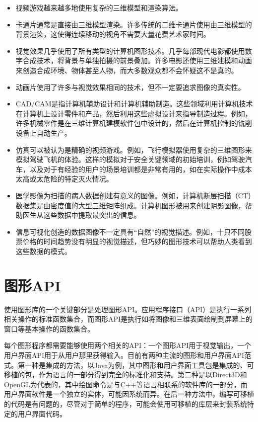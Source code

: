 \documentclass[lang=cn,10pt]{elegantbook}
\begin{document}
\begin{itemize}
\item 视频游戏越来越多地使用复杂的三维模型和渲染算法。
\item 卡通片通常是直接由三维模型渲染。许多传统的二维卡通片使用由三维模型的背景渲染，这使得连续移动的视角不需要大量花费艺术家时间。
\item 视觉效果几乎使用了所有类型的计算机图形技术。几乎每部现代电影都使用数字合成技术，将背景与单独拍摄的前景叠加。许多电影还使用三维建模和动画来创造合成环境、物体甚至人物，而大多数观众都不会怀疑这不是真的。
\item 动画片使用了许多与视觉效果相同的技术，但不一定要追求图像的真实性。
\item CAD/CAM是指计算机辅助设计和计算机辅助制造。这些领域利用计算机技术在计算机上设计零件和产品，然后利用这些虚拟设计来指导制造过程。例如，许多机械零件是在三维计算机建模软件包中设计的，然后在计算机控制的铣削设备上自动生产。
\item 仿真可以被认为是精确的视频游戏。例如，飞行模拟器使用复杂的三维图形来模拟驾驶飞机的体验。这样的模拟对于安全关键领域的初始培训，例如驾驶汽车，以及对于有经验的用户的场景培训都是非常有用的，如在实际操作中成本太高或太危险的特定灭火情况。
\item 医学影像为扫描的病人数据创建有意义的图像。例如，计算机断层扫描（CT）数据集是由密度值的大型三维矩阵组成。计算机图形被用来创建阴影图像，帮助医生从这些数据中提取最突出的信息。
\item 信息可视化创造的数据图像不一定具有“自然”的视觉描述。例如，十只不同股票价格的时间趋势没有明显的视觉描述，但巧妙的图形技术可以帮助人类看到这些数据的模式。
\end{itemize}

\section{图形API}

使用图形库的一个关键部分是处理图形API。应用程序接口（API）是执行一系列相关操作的标准函数集合，而图形API是执行如将图像和三维表面绘制到屏幕上的窗口等基本操作的函数集合。

每个图形程序都需要能够使用两个相关的API：一个图形API用于视觉输出，一个用户界面API用于从用户那里获得输入。目前有两种主流的图形和用户界面API范式。第一种是集成的方法，以Java为例，其中图形和用户界面工具包是集成的、可移植的包，作为语言的一部分得到完全的标准化和支持。第二种是以Direct3D和OpenGL为代表的，其中绘图命令是与C++等语言相联系的软件库的一部分，而用户界面软件是一个独立的实体，可能因系统而异。在后一种方法中，编写可移植的代码是有问题的，尽管对于简单的程序，可能会使用可移植的库层来封装系统特定的用户界面代码。
\end{document}
